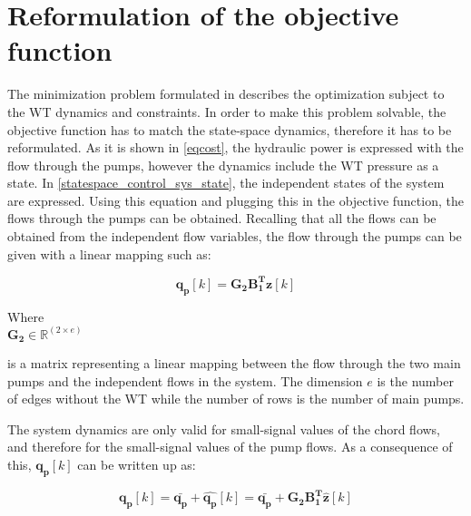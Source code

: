 \section{Reformulation of the objective function}
\label{ObjFunc_reform}

The minimization problem formulated in  describes the optimization subject to the WT dynamics and constraints. In order to make this problem solvable, the objective function has to match the state-space dynamics, therefore it has to be reformulated. As it is shown in \eqref{eqcost}, the hydraulic power is expressed with the flow through the pumps, however the dynamics include the WT pressure as a state. In \eqref{statespace_control_sys_state}, the independent states of the system are expressed. Using this equation and plugging this in the objective function, the flows through the pumps can be obtained. Recalling that all the flows can be obtained from the independent flow variables, the flow through the pumps can be given with a linear mapping such as: 

\begin{equation}
\bm{q_p}[k]  = \bm{G_{2}} \bm{B_{1}^T}  \bm{z}[k]
\label{mapping_mainP}
\end{equation}

\begin{minipage}[t]{0.20\textwidth}
Where\\
\hspace*{8mm} $\bm{G_{2}} \in \bm{\mathbb{R}}^{(2 \times e)} $ 
\end{minipage}
\begin{minipage}[t]{0.68\textwidth}
\vspace*{2mm}
is a matrix representing a linear mapping between the flow through the two main pumps and the independent flows in the system. The dimension $e$ is the number of edges without the WT while the number of rows is the number of main pumps. 
\end{minipage} 

The system dynamics are only valid for small-signal values of the chord flows, and therefore for the small-signal values of the pump flows. As a consequence of this, $\bm{q_p}[k]$ can be written up as:  

\begin{equation}
\bm{q_p}[k]  = \bm{\bar{q_p}} + \bm{\hat{q_p}}[k] = \bm{\bar{q_p}} + \bm{G_{2}} \bm{B_{1}^T}  \bm{\hat{z}}[k]
\label{mapping_mainP_1}
\end{equation}

